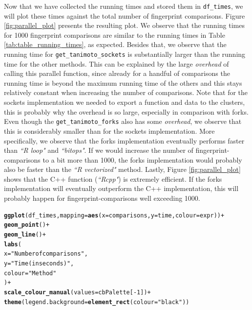 \documentclass[a4paper,11pt]{article}\usepackage[]{graphicx}\usepackage[]{xcolor}
\makeatletter
\newcommand{\hlnum}[1]{\textcolor[rgb]{0.686,0.059,0.569}{#1}}%
\newcommand{\hlsng}[1]{\textcolor[rgb]{0.192,0.494,0.8}{#1}}%
\newcommand{\hlopt}[1]{\textcolor[rgb]{0,0,0}{#1}}%
\newcommand{\hldef}[1]{\textcolor[rgb]{0.345,0.345,0.345}{#1}}%
\newcommand{\hlkwc}[1]{\textcolor[rgb]{0.333,0.667,0.333}{#1}}%
\newcommand{\hlkwd}[1]{\textcolor[rgb]{0.737,0.353,0.396}{\textbf{#1}}}%
\newenvironment{kframe}{%
 \def\at@end@of@kframe{}%
 \ifinner\ifhmode%
  \def\at@end@of@kframe{\end{minipage}}%
  \begin{minipage}{\columnwidth}%
 \fi\fi%
 \def\FrameCommand##1{\hskip\@totalleftmargin \hskip-\fboxsep
 \colorbox{shadecolor}{##1}\hskip-\fboxsep
     \hskip-\linewidth \hskip-\@totalleftmargin \hskip\columnwidth}%
 \MakeFramed {\advance\hsize-\width
   \@totalleftmargin\z@ \linewidth\hsize
   \@setminipage}}%
 {\par\unskip\endMakeFramed%
 \at@end@of@kframe}
\newenvironment{knitrout}{}{} %
\newcommand{\code}[1]{\texttt{#1}}
\makeatother
\begin{document}
\begin{enumerate}
Now that we have collected the running times and stored them in \code{df\_times}, we will plot these times against the total number of fingerprint comparisons. Figure \ref{fig:parallel_plot} presents the resulting plot. We observe that the running times for 1000 fingerprint comparisons are similar to the running times in Table \ref{tab:table_running_times}, as expected. Besides that, we observe that the running time for \code{get\_tanimoto\_sockets} is substantially larger than the running time for the other methods. This can be explained by the large \textit{overhead} of calling this parallel function, since already for a handful of comparisons the running time is beyond the maximum running time of the others and this stays relatively constant when increasing the number of comparisons. Note that for the sockets implementation we needed to export a function and data to the clusters, this is probably why the overhead is so large, especially in comparison with forks. Even though the \code{get\_tanimoto\_forks} also has some \textit{overhead}, we observe that this is considerably smaller than for the sockets implementation. More specifically, we observe that the forks implementation eventually performs faster than \textit{``R loop"} and \textit{``bitops"}. If we would increase the number of fingerprint-comparisons to a bit more than 1000, the forks implementation would probably also be faster than the \textit{``R vectorized"} method. Lastly, Figure \ref{fig:parallel_plot} shows that the C++ function (\textit{``Rcpp"}) is extremely efficient. If the forks implementation will eventually outperform the C++ implementation, this will probably happen for fingerprint-comparisons well exceeding 1000. 

\begin{knitrout}
\color{fgcolor}\begin{kframe}
\begin{alltt}
\hlkwd{ggplot}\hldef{(df_times,} \hlkwc{mapping} \hldef{=} \hlkwd{aes}\hldef{(}\hlkwc{x} \hldef{= comparisons,} \hlkwc{y} \hldef{= time,} \hlkwc{colour} \hldef{= expr))} \hlopt{+}
  \hlkwd{geom_point}\hldef{()} \hlopt{+}
  \hlkwd{geom_line}\hldef{()} \hlopt{+}
  \hlkwd{labs}\hldef{(}
    \hlkwc{x} \hldef{=} \hlsng{"Number of comparisons"}\hldef{,}
    \hlkwc{y} \hldef{=} \hlsng{"Time (in seconds)"}\hldef{,}
    \hlkwc{colour} \hldef{=} \hlsng{"Method"}
  \hldef{)} \hlopt{+}
  \hlkwd{scale_colour_manual}\hldef{(}\hlkwc{values} \hldef{= cbPalette[}\hlopt{-}\hlnum{1}\hldef{])} \hlopt{+}
  \hlkwd{theme}\hldef{(}\hlkwc{legend.background} \hldef{=} \hlkwd{element_rect}\hldef{(}\hlkwc{colour} \hldef{=} \hlsng{"black"}\hldef{))}
\end{alltt}
\end{kframe}\begin{figure}[H]


\end{figure}
\end{knitrout}
\end{enumerate}
\end{document}

